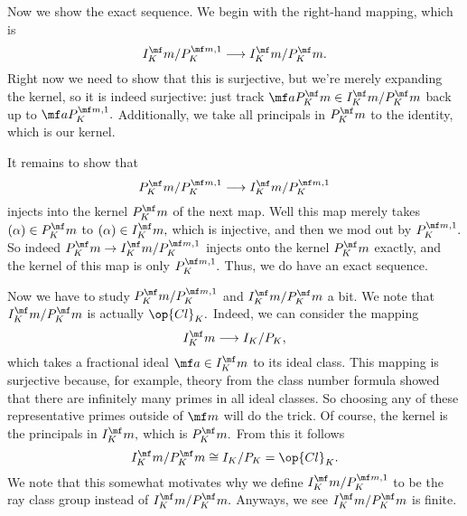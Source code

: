 Now we show the exact sequence. We begin with the right-hand mapping, which is
\[I_K^\mf m/P_K^{\mf m,1}\longrightarrow I_K^\mf m/P_K^\mf m.\]
Right now we need to show that this is surjective, but we're merely expanding the kernel, so it is indeed surjective: just track $\mf aP_K^\mf m\in I_K^\mf m/P_K^\mf m$ back up to $\mf aP_K^{\mf m,1}.$ Additionally, we take all principals in $P_K^\mf m$ to the identity, which is our kernel.

It remains to show that
\[P_K^\mf m/P_K^{\mf m,1}\longrightarrow I_K^\mf m/P_K^{\mf m,1}\]
injects into the kernel $P_K^\mf m$ of the next map. Well this map merely takes $(\alpha)\in P_K^\mf m$ to $(\alpha)\in I_K^\mf m,$ which is injective, and then we mod out by $P_K^{\mf m,1}.$ So indeed $P_K^\mf m\to I_K^\mf m/P_K^{\mf m,1}$ injects onto the kernel $P_K^\mf m$ exactly, and the kernel of this map is only $P_K^{\mf m,1}.$ Thus, we do have an exact sequence.

Now we have to study $P_K^\mf m/P_K^{\mf m,1}$ and $I_K^\mf m/P_K^\mf m$ a bit. We note that $I_K^\mf m/P_K^\mf m$ is actually $\op{Cl}_K.$ Indeed, we can consider the mapping
\[I_K^\mf m\longrightarrow I_K/P_K,\]
which takes a fractional ideal $\mf a\in I_K^\mf m$ to its ideal class. This mapping is surjective because, for example, theory from the class number formula showed that there are infinitely many primes in all ideal classes. So choosing any of these representative primes outside of $\mf m$ will do the trick. Of course, the kernel is the principals in $I_K^\mf m,$ which is $P_K^\mf m.$ From this it follows
\[I_K^\mf m/P_K^\mf m\cong I_K/P_K=\op{Cl}_K.\]
We note that this somewhat motivates why we define $I_K^\mf m/P_K^{\mf m,1}$ to be the ray class group instead of $I_K^\mf m/P_K^\mf m.$ Anyways, we see $I_K^\mf m/P_K^\mf m$ is finite.

